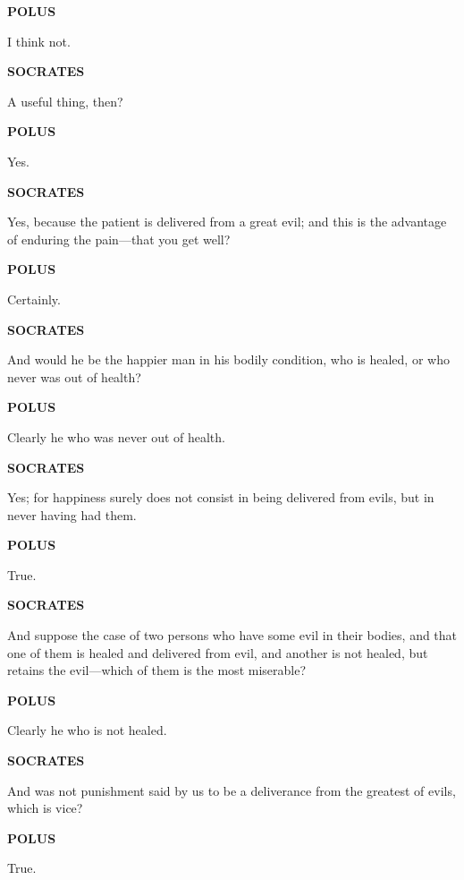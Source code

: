 \documentclass[11pt,letter]{article}
\begin{document}
\par \textbf{POLUS}
\par   I think not.

\par \textbf{SOCRATES}
\par   A useful thing, then?

\par \textbf{POLUS}
\par   Yes.

\par \textbf{SOCRATES}
\par   Yes, because the patient is delivered from a great evil; and this is the advantage of enduring the pain—that you get well?

\par \textbf{POLUS}
\par   Certainly.

\par \textbf{SOCRATES}
\par   And would he be the happier man in his bodily condition, who is healed, or who never was out of health?

\par \textbf{POLUS}
\par   Clearly he who was never out of health.

\par \textbf{SOCRATES}
\par   Yes; for happiness surely does not consist in being delivered from evils, but in never having had them.

\par \textbf{POLUS}
\par   True.

\par \textbf{SOCRATES}
\par   And suppose the case of two persons who have some evil in their bodies, and that one of them is healed and delivered from evil, and another is not healed, but retains the evil—which of them is the most miserable?

\par \textbf{POLUS}
\par   Clearly he who is not healed.

\par \textbf{SOCRATES}
\par   And was not punishment said by us to be a deliverance from the greatest of evils, which is vice?

\par \textbf{POLUS}
\par   True.
\end{document}
